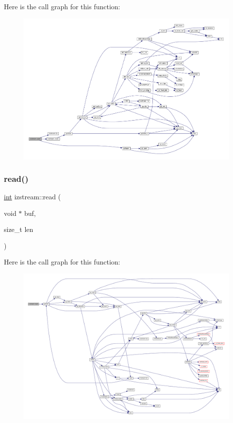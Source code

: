 Here is the call graph for this function\+:
\nopagebreak
\begin{figure}[H]
\begin{center}
\leavevmode
\includegraphics[width=350pt]{classizstream_a1ddcaff781f58a08576f0935be5ccd3c_cgraph}
\end{center}
\end{figure}
\mbox{\label{classizstream_a6e280a19c4a745ab4acc9615788ffa95}} 
\subsubsection{\texorpdfstring{read()}{read()}}
{\footnotesize\ttfamily \mbox{\hyperlink{ioapi_8h_a787fa3cf048117ba7123753c1e74fcd6}{int}} izstream\+::read (\begin{DoxyParamCaption}\item[{void $\ast$}]{buf,  }\item[{size\+\_\+t}]{len }\end{DoxyParamCaption})\hspace{0.3cm}{\ttfamily [inline]}}

Here is the call graph for this function\+:
\nopagebreak
\begin{figure}[H]
\begin{center}
\leavevmode
\includegraphics[width=350pt]{classizstream_a6e280a19c4a745ab4acc9615788ffa95_cgraph}
\end{center}
\end{figure}


